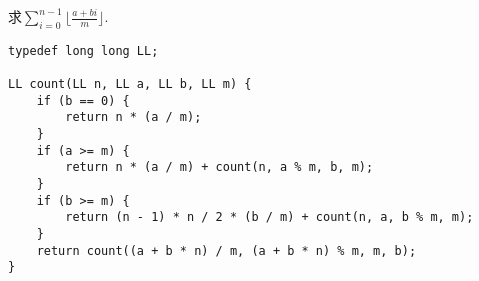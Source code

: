 求$\displaystyle\sum_{i=0}^{n-1} \lfloor\frac{a+bi}{m}\rfloor$.
	\begin{lstlisting}
typedef long long LL;

LL count(LL n, LL a, LL b, LL m) {
	if (b == 0) {
		return n * (a / m);
	}
	if (a >= m) {
		return n * (a / m) + count(n, a % m, b, m);
	}
	if (b >= m) {
		return (n - 1) * n / 2 * (b / m) + count(n, a, b % m, m);
	}
	return count((a + b * n) / m, (a + b * n) % m, m, b);
}

	\end{lstlisting}
